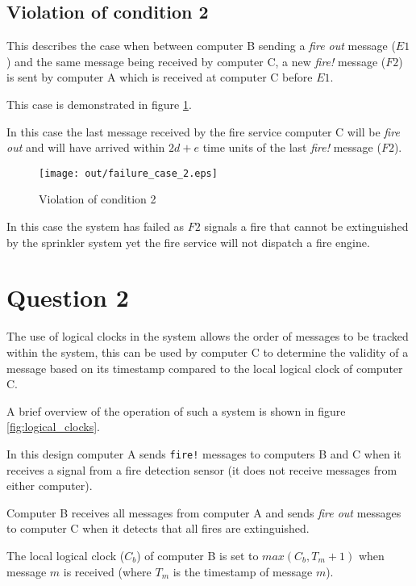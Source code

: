 \documentclass[twocolumn]{article}
\begin{document}
\subsection{Violation of condition 2}
\label{sec:violation_of_condition_2}

This describes the case when between computer B sending a \textit{fire out}
message ($E1$) and the same message being received by computer C, a new
\textit{fire!} message ($F2$) is sent by computer A which is received at
computer C before $E1$.

This case is demonstrated in figure \ref{fig:failure_case_2}.

In this case the last message received by the fire service computer C will be
\textit{fire out} and will have arrived within $2d + e$ time units of the last
\textit{fire!} message ($F2$).

\begin{figure}[h!]
  \centering
  \texttt{[image: out/failure\_case\_2.eps]}
  \caption{Violation of condition 2}
  \label{fig:failure_case_2}
\end{figure}

In this case the system has failed as $F2$ signals a fire that cannot be
extinguished by the sprinkler system yet the fire service will not dispatch a
fire engine.

\section{Question 2}

The use of logical clocks in the system allows the order of messages to be
tracked within the system, this can be used by computer C to determine the
validity of a message based on its timestamp compared to the local logical
clock of computer C.

A brief overview of the operation of such a system is shown in figure
\ref{fig:logical_clocks}.

In this design computer A sends \texttt{fire!} messages to computers B and C
when it receives a signal from a fire detection sensor (it does not receive
messages from either computer).

Computer B receives all messages from computer A and sends \textit{fire out}
messages to computer C when it detects that all fires are extinguished.

The local logical clock ($C_{b}$) of computer B is set to $max(C_{b}, T_{m} +
1)$ when message $m$ is received (where $T_{m}$ is the timestamp of message
$m$).
\end{document}
